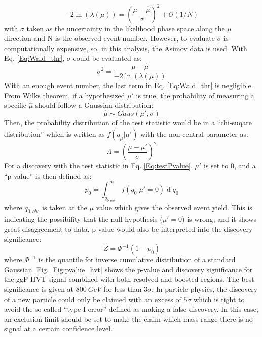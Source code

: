 \begin{equation}
\label{Eq:Wald_thr}
-2\ln(\lambda(\mu))=(\frac{\mu-\hat{\mu}}{\sigma})^2+\mathcal{O}(1/N)
\end{equation}
with $\sigma$ taken as the uncertainty in the likelihood phase space along the $\mu$ direction and N is the observed event number. However, to evaluate $\sigma$ is computationally expensive, so, in this analysis, the Asimov data is used. With Eq. \ref{Eq:Wald_thr}, $\sigma$ could be evaluated as:
\begin{equation}
\sigma^2 = \frac{\mu-\hat{\mu}}{-2\ln(\lambda(\mu))}
\end{equation}
With an enough event number, the last term in Eq. \ref{Eq:Wald_thr} is negligible. From Wilks theorem, if a hypothesized $\mu'$ is true, the probability of measuring a specific $\hat{\mu}$ should follow a Gaussian distribution:
\begin{equation}
\hat{\mu}\sim Gaus(\mu',\sigma)
\end{equation}
Then, the probability distribution of the test statistic would be in a ``chi-suqare distribution'' which is written as $f(q_{\mu}|\mu')$ with the non-central parameter as:
\begin{equation}
\Lambda=(\frac{\mu-\mu'}{\sigma})^2
\end{equation}
For a discovery with the test statistic in Eq. \ref{Eq:testPvalue}, $\mu'$ is set to 0, and a ``p-value'' is then defined as:
\begin{equation}
p_{0}=\int_{q_{0,obs}}^{\infty}f(q_{0}|\mu'=0)\operatorname{d}q_{0}
\end{equation}	 
where $q_{0,obs}$ is taken at the $\mu$ value which gives the observed event yield. This is indicating the possibility that the null hypothesis ($\mu'=0$) is wrong, and it shows great disagreement to data. p-value would also be interpreted into the discovery significance:
\begin{equation}
Z=\Phi^{-1}(1-p_{0})
\end{equation}
where $\Phi^{-1}$ is the quantile for inverse cumulative distribution of a standard Gaussian. Fig. \ref{Fig:pvalue_hvt} shows the p-value and discovery significance for the ggF HVT signal combined with both resolved and boosted regions. The best significance is given at $800~GeV$ for less than $3\sigma$. In particle physics, the discovery of a new particle could only be claimed with an excess of $5\sigma$ which is tight to avoid the so-called ``type-I error'' defined as making a false discovery. In this case, an exclusion limit should be set to make the claim which mass range there is no signal at a certain confidence level. 
